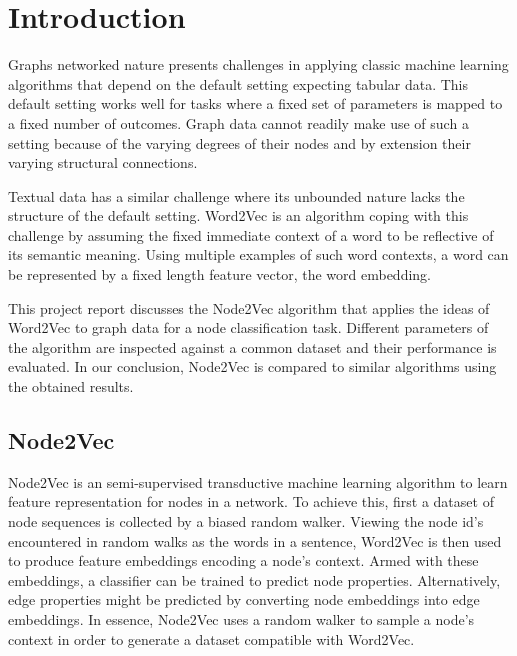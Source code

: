 \documentclass[a4paper,10pt]{article}
\begin{document}



\tableofcontents
\newpage

\section{Introduction}

Graphs networked nature presents challenges in applying classic machine learning algorithms that depend on the default setting expecting tabular data. This default setting works well for tasks where a fixed set of parameters is mapped to a fixed number of outcomes. Graph data cannot readily make use of such a setting because of the varying degrees of their nodes and by extension their varying structural connections.

Textual data has a similar challenge where its unbounded nature lacks the structure of the default setting. Word2Vec is an algorithm coping with this challenge by assuming the fixed immediate context of a word to be reflective of its semantic meaning. Using multiple examples of such word contexts, a word can be represented by a fixed length feature vector, the word embedding.

This project report discusses the Node2Vec algorithm that applies the ideas of Word2Vec to graph data for a node classification task. Different parameters of the algorithm are inspected against a common dataset and their performance is evaluated. In our conclusion, Node2Vec is compared to similar algorithms using the obtained results.

\subsection{Node2Vec}

Node2Vec is an semi-supervised transductive machine learning algorithm to learn feature representation for nodes in a network. To achieve this, first a dataset of node sequences is collected by a biased random walker. Viewing the node id’s encountered in random walks as the words in a sentence, Word2Vec is then used to produce feature embeddings encoding a node’s context. Armed with these embeddings, a classifier can be trained to predict node properties. Alternatively, edge properties might be predicted by converting node embeddings into edge embeddings. In essence, Node2Vec uses a random walker to sample a node's context in order to generate a dataset compatible with Word2Vec.
\end{document}
